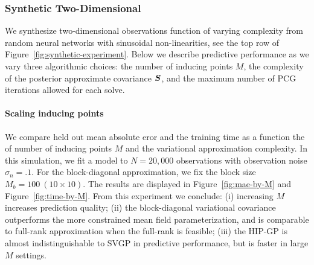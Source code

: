 \subsubsection{Synthetic Two-Dimensional}
\label{sec:experiment-synthetic}
 We synthesize two-dimensional observations function of varying complexity
 from random neural networks with sinusoidal non-linearities,
see the top row of Figure~\ref{fig:synthetic-experiment}.
Below we describe predictive performance as we vary three algorithmic choices:
the number of inducing points $M$, the complexity of the posterior approximate
covariance $\boldsymbol{S}$, and the maximum number of PCG iterations allowed for each
solve.

\paragraph{Scaling inducing points}
We compare held out mean absolute eror and
the training time as a function the of number of
inducing points $M$ and the variational approximation complexity.
In this simulation, we fit a model to $N=20{,}000$ observations with
observation noise $\sigma_n = .1$.
For the block-diagonal approximation, we fix the block size $M_b = 100~(10\times10)$.
The results are displayed in Figure~\ref{fig:mae-by-M} and Figure~\ref{fig:time-by-M}.
From this experiment we conclude:
(i) increasing $M$ increases prediction quality;
(ii) the block-diagonal variational covariance outperforms the more
constrained mean field parameterization, and is comparable to full-rank approximation
when the full-rank is feasible; (iii) the HIP-GP is almost indistinguishable to SVGP in predictive performance,
but is faster in large $M$ settings.

